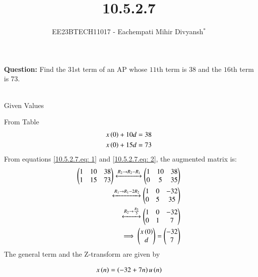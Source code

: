 \documentclass[journal,12pt,twocolumn]{IEEEtran}
\theoremstyle{remark}
\begin{document}

\vspace{3cm}

\title{10.5.2.7}
\author{EE23BTECH11017 - Eachempati Mihir Divyansh$^{*}$%
}
\maketitle
\newpage
\bigskip

\renewcommand{\thefigure}{\theenumi}
\renewcommand{\thetable}{\theenumi}

\textbf{Question:} Find the 31st term of an AP whose $11$th term is 38 and the $16$th term is 73.
\\
\solution
\\

\begin{table}[h]
    \centering
    \label{tab:1}
    \caption{Given Values}
\end{table}
From Table 
\begin{align}
x\left(0\right)+10d&=38\label{10.5.2.7.eq: 1}\\
x\left(0\right)+15d&=73 \label{10.5.2.7.eq: 2}
\end{align}
From  equations \ref{10.5.2.7.eq: 1} and \ref{10.5.2.7.eq: 2}, the augmented matrix is:
\begin{align}
 \begin{pmatrix}
   1 & 10 & 38
   \\
   1 & 15 & 73
 \end{pmatrix} 
 \xleftrightarrow[]{R_2 \rightarrow R_2-R_1} 
  \begin{pmatrix}
   1 & 10 & 38
   \\
   0 & 5 & 35
 \end{pmatrix} \\
 \xleftrightarrow[]{R_1 \rightarrow R_1-2R_2} 
  \begin{pmatrix}
   1 & 0 & -32
   \\
   0 & 5 & 35
 \end{pmatrix} \\
  \xleftrightarrow[]{R_2 \rightarrow \frac{R_2}{5}} 
  \begin{pmatrix}
   1 & 0 & -32
   \\
   0 & 1 & 7
 \end{pmatrix} \\
 \implies \begin{pmatrix}
   x\left(0\right)
   \\
   d
 \end{pmatrix}
 =
 \begin{pmatrix}
   -32
   \\
   7
 \end{pmatrix}
 \end{align}
 The general term and the Z-transform are given by

 \begin{align}
    x\left(n\right)&=\left(-32+7n\right)u\left(n\right)\\ 
 \end{align}
\end{document}
